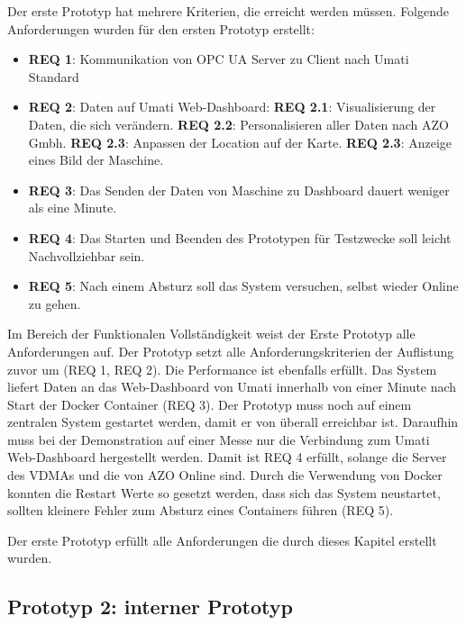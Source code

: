 \documentclass[a4paper, 12pt, oneside, toc=listofnumbered, bibliography=totoc]{scrbook}
\begin{document}
		Der erste Prototyp hat mehrere Kriterien, die erreicht werden müssen. Folgende Anforderungen wurden für den ersten Prototyp erstellt:
		
		\begin{itemize}
			\item \textbf{REQ 1}: Kommunikation von OPC UA Server zu Client nach Umati Standard
			\item \textbf{REQ 2}: Daten auf Umati Web-Dashboard:
			\subitem \textbf{REQ 2.1}: Visualisierung der Daten, die sich verändern.
			\subitem \textbf{REQ 2.2}: Personalisieren aller Daten nach AZO Gmbh.
			\subitem \textbf{REQ 2.3}: Anpassen der Location auf der Karte.
			\subitem \textbf{REQ 2.3}: Anzeige eines Bild der Maschine.
			
			\item \textbf{REQ 3}: Das Senden der Daten von Maschine zu Dashboard dauert weniger als eine Minute.
			
			\item \textbf{REQ 4}: Das Starten und Beenden des Prototypen für Testzwecke soll leicht Nachvollziehbar sein. 
			
			\item \textbf{REQ 5}: Nach einem Absturz soll das System versuchen, selbst wieder Online zu gehen. 
		\end{itemize}
	
		Im Bereich der Funktionalen Vollständigkeit weist der Erste Prototyp alle Anforderungen auf. Der Prototyp setzt alle Anforderungskriterien der Auflistung zuvor um (REQ 1, REQ 2). Die Performance ist ebenfalls erfüllt. Das System liefert Daten an das Web-Dashboard von Umati innerhalb von einer Minute nach Start der Docker Container (REQ 3). Der Prototyp muss noch auf einem zentralen System gestartet werden, damit er von überall erreichbar ist. Daraufhin muss bei der Demonstration auf einer Messe nur die Verbindung zum Umati Web-Dashboard hergestellt werden. Damit ist REQ 4 erfüllt, solange die Server des VDMAs und die von AZO Online sind. Durch die Verwendung von Docker konnten die Restart Werte so gesetzt werden, dass sich das System neustartet, sollten kleinere Fehler zum Absturz eines Containers führen (REQ 5).
		
		Der erste Prototyp erfüllt alle Anforderungen die durch dieses Kapitel erstellt wurden.		
		
		\subsection{Prototyp 2: interner Prototyp}\label{Prototyp:2}
		
\end{document}
